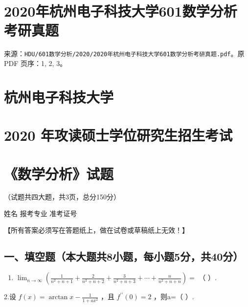 \documentclass[11pt,fontset=fandol]{ctexart}
\providecommand{\tightlist}{\setlength{\itemsep}{0pt}\setlength{\parskip}{0pt}}
\begin{document}
\section{2020年杭州电子科技大学601数学分析考研真题}\label{ux5e74ux676dux5ddeux7535ux5b50ux79d1ux6280ux5927ux5b66601ux6570ux5b66ux5206ux6790ux8003ux7814ux771fux9898}

来源：\texttt{HDU/601数学分析/2020/2020年杭州电子科技大学601数学分析考研真题.pdf}。原
PDF 页序：1, 2, 3。

\section{杭州电子科技大学}\label{ux676dux5ddeux7535ux5b50ux79d1ux6280ux5927ux5b66}

\section{2020
年攻读硕士学位研究生招生考试}\label{ux5e74ux653bux8bfbux7855ux58ebux5b66ux4f4dux7814ux7a76ux751fux62dbux751fux8003ux8bd5}

\section{《数学分析》试题}\label{ux6570ux5b66ux5206ux6790ux8bd5ux9898}

（试题共四大题，共3页，总分150分）

姓名 报考专业 准考证号

【所有答案必须写在答题纸上，做在试卷或草稿纸上无效！】

\subsection{一、填空题（本大题共8小题，每小题5分，共40分）}\label{ux4e00ux586bux7a7aux9898ux672cux5927ux9898ux51718ux5c0fux9898ux6bcfux5c0fux98985ux5206ux517140ux5206}

\begin{enumerate}
\def\labelenumi{\arabic{enumi}.}
\tightlist
\item
  \(\lim _ { n \to \infty } \left( { \frac { 1 } { n ^ { 2 } + n + 1 } } + { \frac { 2 } { n ^ { 2 } + n + 2 } } + { \frac { 3 } { n ^ { 2 } + n + 3 } } + \cdots + { \frac { n } { n ^ { 2 } + n + n } } \right) =\)
  （ ）.
\end{enumerate}

2.设 \(f ( x ) { = } \arctan x - { \frac { 1 } { 1 + a x ^ { 2 } } }\)
，且 \(f ^ { \prime \prime } ( 0 ) = 2\) ，则a=（ ）.
\end{document}
